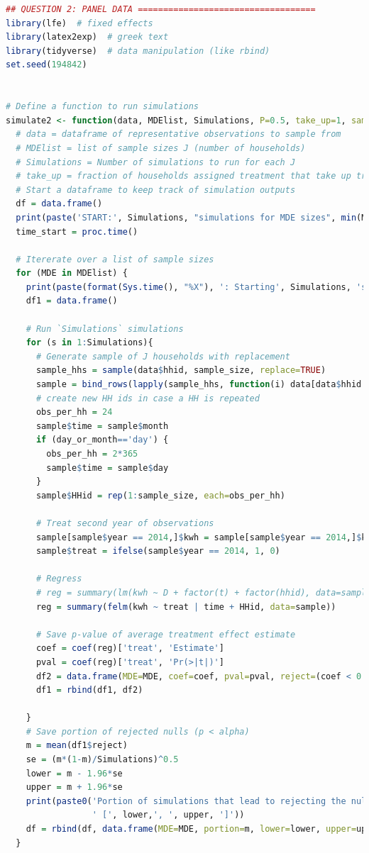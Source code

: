 \documentclass[12pt]{article}
\begin{document}
\begin{lstlisting}[language=R]
## QUESTION 2: PANEL DATA ===================================
library(lfe)  # fixed effects
library(latex2exp)  # greek text
library(tidyverse)  # data manipulation (like rbind)
set.seed(194842)


# Define a function to run simulations
simulate2 <- function(data, MDElist, Simulations, P=0.5, take_up=1, sample_size=97, day_or_month='day') {
  # data = dataframe of representative observations to sample from
  # MDElist = list of sample sizes J (number of households)
  # Simulations = Number of simulations to run for each J
  # take_up = fraction of households assigned treatment that take up treatment
  # Start a dataframe to keep track of simulation outputs
  df = data.frame()
  print(paste('START:', Simulations, "simulations for MDE sizes", min(MDElist), 'to', max(MDElist)))
  time_start = proc.time()
  
  # Itererate over a list of sample sizes
  for (MDE in MDElist) {
    print(paste(format(Sys.time(), "%X"), ': Starting', Simulations, 'simulations for MDE =', MDE))
    df1 = data.frame()
    
    # Run `Simulations` simulations
    for (s in 1:Simulations){
      # Generate sample of J households with replacement
      sample_hhs = sample(data$hhid, sample_size, replace=TRUE)
      sample = bind_rows(lapply(sample_hhs, function(i) data[data$hhid %in% c(i), ]))
      # create new HH ids in case a HH is repeated
      obs_per_hh = 24
      sample$time = sample$month
      if (day_or_month=='day') {
        obs_per_hh = 2*365
        sample$time = sample$day
      }
      sample$HHid = rep(1:sample_size, each=obs_per_hh)
      
      # Treat second year of observations
      sample[sample$year == 2014,]$kwh = sample[sample$year == 2014,]$kwh*(1 - MDE)
      sample$treat = ifelse(sample$year == 2014, 1, 0)
      
      # Regress
      # reg = summary(lm(kwh ~ D + factor(t) + factor(hhid), data=sample))
      reg = summary(felm(kwh ~ treat | time + HHid, data=sample))
      
      # Save p-value of average treatment effect estimate
      coef = coef(reg)['treat', 'Estimate']
      pval = coef(reg)['treat', 'Pr(>|t|)']
      df2 = data.frame(MDE=MDE, coef=coef, pval=pval, reject=(coef < 0 && pval <= 0.05))
      df1 = rbind(df1, df2)
      
    }
    # Save portion of rejected nulls (p < alpha)
    m = mean(df1$reject)
    se = (m*(1-m)/Simulations)^0.5
    lower = m - 1.96*se
    upper = m + 1.96*se
    print(paste0('Portion of simulations that lead to rejecting the null: ', m,
                 ' [', lower,', ', upper, ']'))
    df = rbind(df, data.frame(MDE=MDE, portion=m, lower=lower, upper=upper, simulations=Simulations))
  }
  

\end{lstlisting}
\end{document}
